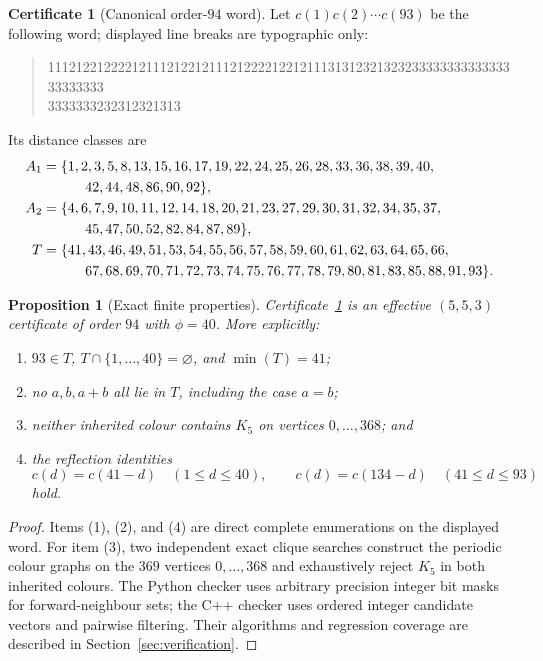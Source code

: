 \documentclass[11pt]{article}
\newtheorem{proposition}[theorem]{Proposition}
\theoremstyle{definition}
\newtheorem{certificate}[theorem]{Certificate}
\theoremstyle{remark}
\begin{document}
\begin{certificate}[Canonical order-$94$ word]
\label{cert:order94}
Let $c(1)c(2)\cdots c(93)$ be the following word; displayed line breaks are
typographic only:
\begin{quote}
\ttfamily\footnotesize
11121221222212111212212111212222122121113131232132323333333333333333333333\\
3333333232312321313
\end{quote}
Its distance classes are
\begin{align*}
A_1={}&\{1,2,3,5,8,13,15,16,17,19,22,24,25,26,28,33,36,38,39,40,\\
&\hspace{1.75em}42,44,48,86,90,92\},\\
A_2={}&\{4,6,7,9,10,11,12,14,18,20,21,23,27,29,30,31,32,34,35,37,\\
&\hspace{1.75em}45,47,50,52,82,84,87,89\},\\
T={}&\{41,43,46,49,51,53,54,55,56,57,58,59,60,61,62,63,64,65,66,\\
&\hspace{1.75em}67,68,69,70,71,72,73,74,75,76,77,78,79,80,81,83,85,88,91,93\}.
\end{align*}
\end{certificate}

\begin{proposition}[Exact finite properties]
\label{prop:order94}
Certificate~\ref{cert:order94} is an effective $(5,5,3)$ certificate of
order $94$ with $\phi=40$.  More explicitly:
\begin{enumerate}
  \item $93\in T$, $T\cap\{1,\ldots,40\}=\varnothing$, and $\min(T)=41$;
  \item no $a,b,a+b$ all lie in $T$, including the case $a=b$;
  \item neither inherited colour contains $K_5$ on vertices
  $0,\ldots,368$; and
  \item the reflection identities
  \[
    c(d)=c(41-d)\quad(1\le d\le40),
    \qquad
    c(d)=c(134-d)\quad(41\le d\le93)
  \]
  hold.
\end{enumerate}
\end{proposition}

\begin{proof}
Items (1), (2), and (4) are direct complete enumerations on the displayed
word.  For item (3), two independent exact clique searches construct the
periodic colour graphs on the $369$ vertices $0,\ldots,368$ and exhaustively
reject $K_5$ in both inherited colours.  The Python checker uses arbitrary
precision integer bit masks for forward-neighbour sets; the C++ checker uses
ordered integer candidate vectors and pairwise filtering.  Their algorithms
and regression coverage are described in Section~\ref{sec:verification}.
\end{proof}
\end{document}
